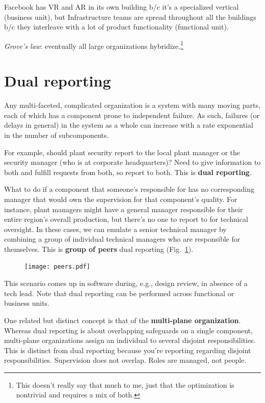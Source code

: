 \documentclass{article}
\begin{document}
  Facebook has VR and AR in its own building b/c it's a specialized vertical (business unit), but Infrastructure teams are spread throughout all the buildings b/c they interleave with a lot of product functionality (functional unit).

\textit{Grove's law}: eventually all large organizations hybridize.\footnote{This doesn't really say that much to me, just that the optimization is nontrivial and requires a mix of both.}

\section{Dual reporting}

Any multi-faceted, complicated organization is a system with many moving parts, each of which has a component prone to independent failure. As such, failures (or delays in general) in the system as a whole can increase with a rate exponential in the number of subcomponents.

For example, should plant security report to the local plant manager or the security manager (who is at corporate headquarters)? Need to give information to both and fulfill requests from both, so report to both. This is \textbf{dual reporting}.

What to do if a component that someone's responsible for has no corresponding manager that would own the supervision for that component's quality. For instance, plant managers might have a general manager responsible for their entire region's overall production, but there's no one to report to for technical oversight. In these cases, we can emulate a senior technical manager by combining a group of individual technical managers who are responsible for themselves. This is \textbf{group of peers} dual reporting (Fig.~\ref{fig:peers}).

\begin{figure}[h]
  \centering
  \texttt{[image: peers.pdf]}
  \caption{\label{fig:peers} }
\end{figure}

This scenario comes up in software during, e.g., design review, in absence of a tech lead. Note that dual reporting can be performed across functional or business units.

One related but distinct concept is that of the \textbf{multi-plane organization}. Whereas dual reporting is about overlapping safeguards on a single component, multi-plane organizations assign an individual to several disjoint responsibilities. This is distinct from dual reporting because you’re reporting regarding disjoint responsibilities. Supervision does not overlap. Roles are managed, not people.
\end{document}

